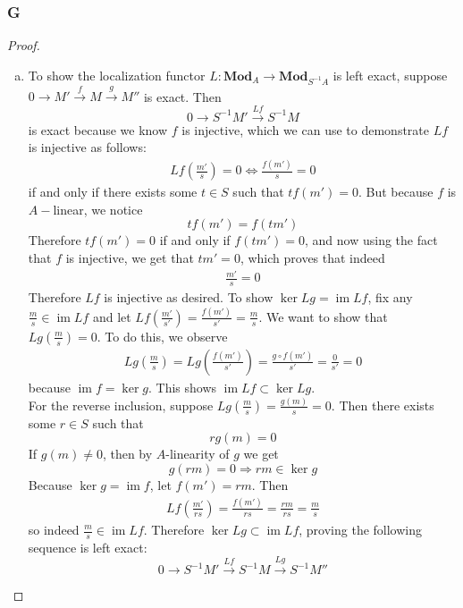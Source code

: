 \documentclass{article}
\newcommand{\Mod}{\mathbf{Mod}} %
\DeclareMathOperator{\im}{\mathrm{im}}
\begin{document}
\subsubsection{G}\label{1.6.G}
\begin{proof}
    \begin{enumerate}[(a)]
        \item To show the localization functor $L:\Mod_A\to \Mod_{S^{-1}A}$ is left exact, suppose $0\rightarrow M' \xrightarrow{f}M \xrightarrow{g}M''$ is exact. Then
        \[
        0\rightarrow S^{-1}M'\xrightarrow{Lf} S^{-1}M
        \]
        is exact because we know $f$ is injective, which we can use to demonstrate $Lf$ is injective as follows:
        \begin{align*}
            Lf(\frac{m'}{s})=0\iff \frac{f(m')}{s}=0
        \end{align*}
        if and only if there exists some $t\in S$ such that $tf(m')=0$. But because $f$ is $A-$linear, we notice
        \[
        tf(m')=f(tm')
        \]
        Therefore $tf(m')=0$ if and only if $f(tm')=0$, and now using the fact that $f$ is injective, we get that $tm'=0$, which proves that indeed
        \begin{align*}
            \frac{m'}{s}=0
        \end{align*}
        Therefore $Lf$ is injective as desired. To show $\ker Lg=\im Lf$, fix any $\frac{m}{s}\in \im Lf$ and let $Lf(\frac{m'}{s'})=\frac{f(m')}{s'}=\frac{m}{s}$. We want to show that $Lg(\frac{m}{s})=0$. To do this, we observe
        \begin{align*}
            Lg(\frac{m}{s})=Lg(\frac{f(m')}{s'})=\frac{g\circ f(m')}{s'}=\frac{0}{s'}=0
        \end{align*}
        because $\im f=\ker g$. This shows $\im Lf \subset \ker Lg$.\\
        For the reverse inclusion, suppose $Lg(\frac{m}{s})=\frac{g(m)}{s}=0$. Then there exists some $r\in S$ such that
        \[
        rg(m)=0
        \]
        If $g(m)\ne 0$, then by $A$-linearity of $g$ we get
        \[
        g(rm)=0\Rightarrow rm\in \ker g
        \]
        Because $\ker g=\im f$, let $f(m')=rm$. Then
        \begin{align*}
            Lf(\frac{m'}{rs})=\frac{f(m')}{rs}=\frac{rm}{rs}=\frac{m}{s}
        \end{align*}
        so indeed $\frac{m}{s}\in \im Lf$. Therefore $\ker Lg\subset \im Lf$, proving the following sequence is left exact:
        \[
        0\to S^{-1}M'\xrightarrow{Lf} S^{-1}M\xrightarrow{Lg} S^{-1}M''
\]
\end{enumerate}
\end{proof}
\end{document}
